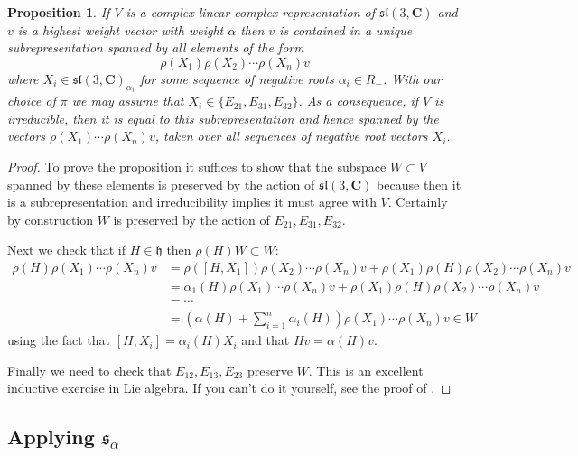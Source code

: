 \documentclass[12pt]{article}
\newcommand{\CC}{\mathbf{C}}
\newtheorem{prp}[thm]{Proposition}
\theoremstyle{definition}
\theoremstyle{check}
\theoremstyle{remark}
\theoremstyle{TheoremNum}
\begin{document}
\begin{prp}\label{prp-irrep-span}
If $V$ is a complex linear complex representation of $\mathfrak{sl}(3,\CC)$ and $v$ is a highest weight vector with weight $\alpha$ then $v$ is contained in a unique subrepresentation spanned by all elements of the form
\[\rho(X_1)\rho(X_2)\cdots\rho(X_n)v\]
where $X_i\in \mathfrak{sl}(3,\CC)_{\alpha_i}$ for some sequence of negative roots $\alpha_i\in R_-$. With our choice of $\pi$ we may assume that $X_i\in\{E_{21},E_{31},E_{32}\}$. As a consequence, if $V$ is irreducible, then it is equal to this subrepresentation and hence spanned by the vectors $\rho(X_1)\cdots\rho(X_n)v$, taken over all sequences of negative root vectors $X_i$.
\end{prp}
\begin{proof}
To prove the proposition it suffices to show that the subspace $W\subset V$ spanned by these elements is preserved by the action of $\mathfrak{sl}(3,\CC)$ because then it is a subrepresentation and irreducibility implies it must agree with $V$. Certainly by construction $W$ is preserved by the action of $E_{21},E_{31},E_{32}$.

Next we check that if $H\in\mathfrak{h}$ then $\rho(H)W\subset W$:
\begin{align*}
\rho(H)\rho(X_1)\cdots\rho(X_n)v&=\rho([H,X_1])\rho(X_2)\cdots\rho(X_n)v+\rho(X_1)\rho(H)\rho(X_2)\cdots\rho(X_n)v\\
&=\alpha_1(H)\rho(X_1)\cdots\rho(X_n)v+\rho(X_1)\rho(H)\rho(X_2)\cdots\rho(X_n)v\\
&=\cdots\\
&=\left(\alpha(H)+\sum_{i=1}^n\alpha_i(H)\right)\rho(X_1)\cdots\rho(X_n)v\in W
\end{align*}
using the fact that $[H,X_i]=\alpha_i(H)X_i$ and that $Hv=\alpha(H)v$.

Finally we need to check that $E_{12},E_{13},E_{23}$ preserve $W$. This is an excellent inductive exercise in Lie algebra. If you can't do it yourself, see the proof of {\cite[Claim 12.10]{FultonHarris}}.
\end{proof}

\subsection{Applying \texorpdfstring{$\mathfrak{s}_{\alpha}$}{sl(2,C)-subalgebras}}
\end{document}
